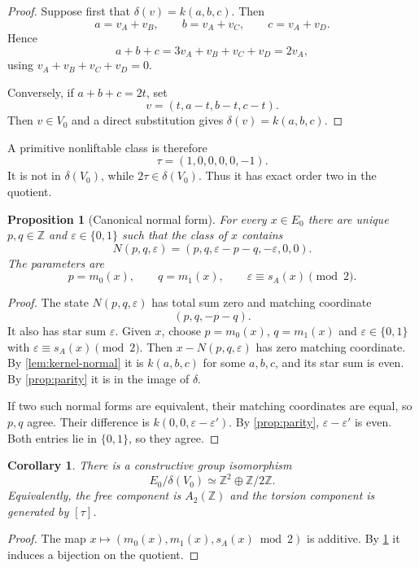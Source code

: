 \documentclass[11pt]{amsart}
\newtheorem{proposition}[theorem]{Proposition}
\newtheorem{corollary}[theorem]{Corollary}
\theoremstyle{definition}
\theoremstyle{remark}
\newcommand{\Z}{\mathbb Z}
\begin{document}
\begin{proof}
Suppose first that $\delta(v)=k(a,b,c)$. Then
\[
a=v_A+v_B,\qquad b=v_A+v_C,\qquad c=v_A+v_D.
\]
Hence
\[
a+b+c=3v_A+v_B+v_C+v_D=2v_A,
\]
using $v_A+v_B+v_C+v_D=0$.

Conversely, if $a+b+c=2t$, set
\[
v=(t,a-t,b-t,c-t).
\]
Then $v\in V_0$ and a direct substitution gives $\delta(v)=k(a,b,c)$.
\end{proof}

A primitive nonliftable class is therefore
\[
\tau=(1,0,0,0,0,-1).
\]
It is not in $\delta(V_0)$, while $2\tau\in\delta(V_0)$. Thus it has exact order two in the quotient.

\begin{proposition}[Canonical normal form]\label{prop:normalform}
For every $x\in E_0$ there are unique $p,q\in\Z$ and $\varepsilon\in\{0,1\}$ such that the class of $x$ contains
\begin{equation}\label{eq:normalform}
N(p,q,\varepsilon)
=(p,q,\varepsilon-p-q,-\varepsilon,0,0).
\end{equation}
The parameters are
\[
p=m_0(x),\qquad q=m_1(x),\qquad
\varepsilon\equiv s_A(x)\pmod2.
\]
\end{proposition}

\begin{proof}
The state $N(p,q,\varepsilon)$ has total sum zero and matching coordinate
\[
(p,q,-p-q).
\]
It also has star sum $\varepsilon$. Given $x$, choose $p=m_0(x)$, $q=m_1(x)$ and $\varepsilon\in\{0,1\}$ with $\varepsilon\equiv s_A(x)\pmod2$. Then $x-N(p,q,\varepsilon)$ has zero matching coordinate. By \cref{lem:kernel-normal} it is $k(a,b,c)$ for some $a,b,c$, and its star sum is even. By \cref{prop:parity} it is in the image of $\delta$.

If two such normal forms are equivalent, their matching coordinates are equal, so $p,q$ agree. Their difference is $k(0,0,\varepsilon-\varepsilon')$. By \cref{prop:parity}, $\varepsilon-\varepsilon'$ is even. Both entries lie in $\{0,1\}$, so they agree.
\end{proof}

\begin{corollary}\label{cor:quotient}
There is a constructive group isomorphism
\[
E_0/\delta(V_0)\simeq \Z^2\oplus\Z/2\Z.
\]
Equivalently, the free component is $A_2(\Z)$ and the torsion component is generated by $[\tau]$.
\end{corollary}

\begin{proof}
The map $x\mapsto(m_0(x),m_1(x),s_A(x)\bmod 2)$ is additive. By \cref{prop:normalform} it induces a bijection on the quotient.
\end{proof}
\end{document}
